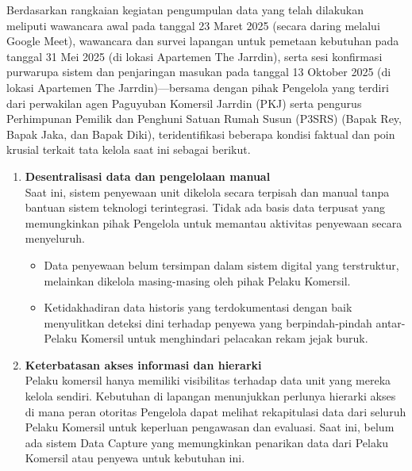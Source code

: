 Berdasarkan rangkaian kegiatan pengumpulan data yang telah dilakukan meliputi wawancara awal pada tanggal 23 Maret 2025 (secara daring melalui Google Meet), wawancara dan survei lapangan untuk pemetaan kebutuhan pada tanggal 31 Mei 2025 (di lokasi Apartemen The Jarrdin), serta sesi konfirmasi purwarupa sistem dan penjaringan masukan pada tanggal 13 Oktober 2025 (di lokasi Apartemen The Jarrdin)—bersama dengan pihak Pengelola yang terdiri dari perwakilan agen Paguyuban Komersil Jarrdin (PKJ) serta pengurus Perhimpunan Pemilik dan Penghuni Satuan Rumah Susun (P3SRS) (Bapak Rey, Bapak Jaka, dan Bapak Diki), teridentifikasi beberapa kondisi faktual dan poin krusial terkait tata kelola saat ini sebagai berikut.

\begin{enumerate}
    \item \textbf{Desentralisasi data dan pengelolaan manual} \\
    Saat ini, sistem penyewaan unit dikelola secara terpisah dan manual tanpa bantuan sistem teknologi terintegrasi. Tidak ada basis data terpusat yang memungkinkan pihak Pengelola untuk memantau aktivitas penyewaan secara menyeluruh. 
    \begin{itemize}
        \item Data penyewaan belum tersimpan dalam sistem digital yang terstruktur, melainkan dikelola masing-masing oleh pihak Pelaku Komersil.
        \item Ketidakhadiran data historis yang terdokumentasi dengan baik menyulitkan deteksi dini terhadap penyewa yang berpindah-pindah antar-Pelaku Komersil untuk menghindari pelacakan rekam jejak buruk.
    \end{itemize}

    \item \textbf{Keterbatasan akses informasi dan hierarki} \\
    Pelaku komersil hanya memiliki visibilitas terhadap data unit yang mereka kelola sendiri. Kebutuhan di lapangan menunjukkan perlunya hierarki akses di mana peran otoritas Pengelola dapat melihat rekapitulasi data dari seluruh Pelaku Komersil untuk keperluan pengawasan dan evaluasi. Saat ini, belum ada sistem {Data Capture} yang memungkinkan penarikan data dari Pelaku Komersil atau penyewa untuk kebutuhan ini.


\end{enumerate}
